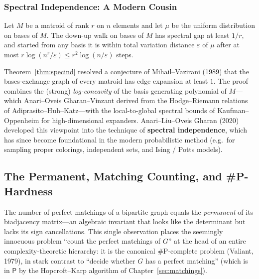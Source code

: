 \subsubsection{Spectral Independence: A Modern Cousin}

\begin{theorem}\label{thm:specind}
Let $M$ be a matroid of rank $r$ on $n$ elements and let $\mu$ be the
uniform distribution on bases of $M$. The down-up walk on bases of
$M$ has spectral gap at least $1/r$, and started from any basis it is
within total variation distance $\varepsilon$ of $\mu$ after at most
$r \log(n^r/\varepsilon) \le r^2 \log(n/\varepsilon)$ steps.
\end{theorem}

\begin{remark}
Theorem~\ref{thm:specind} resolved a conjecture of Mihail--Vazirani
(1989) that the bases-exchange graph of every matroid has edge
expansion at least $1$. The proof combines the (strong)
\emph{log-concavity} of the basis generating polynomial of $M$---which
Anari--Oveis Gharan--Vinzant derived from the Hodge--Riemann relations
of Adiprasito--Huh--Katz---with the local-to-global spectral bounds of
Kaufman--Oppenheim for high-dimensional expanders.
Anari--Liu--Oveis Gharan (2020) developed this viewpoint into the
technique of \textbf{spectral independence}, which has
since become foundational in the modern probabilistic method (e.g.\
for sampling proper colorings, independent sets, and Ising / Potts
models).
\end{remark}

\subsection{The Permanent, Matching Counting, and \#P-Hardness}\label{subsec:permanent}

The number of perfect matchings of a bipartite graph equals the
\emph{permanent} of its biadjacency matrix---an algebraic invariant
that looks like the determinant but lacks its sign cancellations.
This single observation places the seemingly innocuous problem
``count the perfect matchings of $G$'' at the head of an entire
complexity-theoretic hierarchy: it is the canonical \#P-complete
problem (Valiant, 1979), in stark contrast to ``decide whether $G$
has a perfect matching'' (which is in $\mathsf P$ by the Hopcroft--Karp
algorithm of Chapter~\ref{sec:matchings}).


